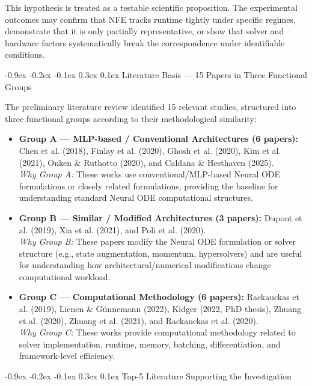 \documentclass[10pt,a4paper]{article}
\makeatletter
\renewcommand{\section}{\@startsection{section}{1}{\z@}%
  {-0.9ex \@plus -0.2ex \@minus -0.1ex}%
  {0.3ex \@plus 0.1ex}%
  {\normalfont\normalsize\bfseries}}
\makeatother
\begin{document}
This hypothesis is treated as a testable scientific proposition. The experimental outcomes may confirm that NFE tracks runtime tightly under specific regimes, demonstrate that it is only partially representative, or show that solver and hardware factors systematically break the correspondence under identifiable conditions.

\section{Literature Basis --- 15 Papers in Three Functional Groups}

The preliminary literature review identified 15 relevant studies, structured into three functional groups according to their methodological similarity:
\begin{itemize}
    \item \textbf{Group A --- MLP-based / Conventional Architectures (6 papers):} Chen et al. (2018), Finlay et al. (2020), Ghosh et al. (2020), Kim et al. (2021), Onken \& Ruthotto (2020), and Caldana \& Hesthaven (2025). \\
    \emph{Why Group A:} These works use conventional/MLP-based Neural ODE formulations or closely related formulations, providing the baseline for understanding standard Neural ODE computational structures.
    \item \textbf{Group B --- Similar / Modified Architectures (3 papers):} Dupont et al. (2019), Xia et al. (2021), and Poli et al. (2020). \\
    \emph{Why Group B:} These papers modify the Neural ODE formulation or solver structure (e.g., state augmentation, momentum, hypersolvers) and are useful for understanding how architectural/numerical modifications change computational workload.
    \item \textbf{Group C --- Computational Methodology (6 papers):} Rackauckas et al. (2019), Lienen \& G{\"u}nnemann (2022), Kidger (2022, PhD thesis), Zhuang et al. (2020), Zhuang et al. (2021), and Rackauckas et al. (2020). \\
    \emph{Why Group C:} These works provide computational methodology related to solver implementation, runtime, memory, batching, differentiation, and framework-level efficiency.
\end{itemize}

\section{Top-5 Literature Supporting the Investigation}
\end{document}
